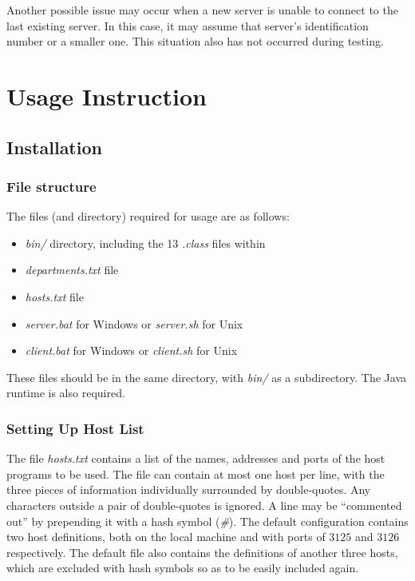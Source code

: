 \documentclass[a4paper,11pt]{article}
\begin{document}
Another possible issue may occur when a new server is unable to connect to the last existing server. In this case, it may assume that server's identification number or a smaller one. This situation also has not occurred during testing.

\section{Usage Instruction}
\subsection{Installation}
\subsubsection{File structure}
The files (and directory) required for usage are as follows:

\begin{itemize}
\item \emph{bin/} directory, including the 13 \emph{.class} files within
\item \emph{departments.txt} file
\item \emph{hosts.txt} file
\item \emph{server.bat} for Windows or \emph{server.sh} for Unix
\item \emph{client.bat} for Windows or \emph{client.sh} for Unix
\end{itemize}

\noindent
These files should be in the same directory, with \emph{bin/} as a subdirectory. The Java runtime is also required.

\subsubsection{Setting Up Host List}
The file \emph{hosts.txt} contains a list of the names, addresses and ports of the host programs to be used. The file can contain at most one host per line, with the three pieces of information individually surrounded by double-quotes. Any characters outside a pair of double-quotes is ignored. A line may be ``commented out'' by prepending it with a hash symbol (\emph{\#}). The default configuration contains two host definitions, both on the local machine and with ports of $3125$ and $3126$ respectively. The default file also contains the definitions of another three hosts, which are excluded with hash symbols so as to be easily included again.
\end{document}
